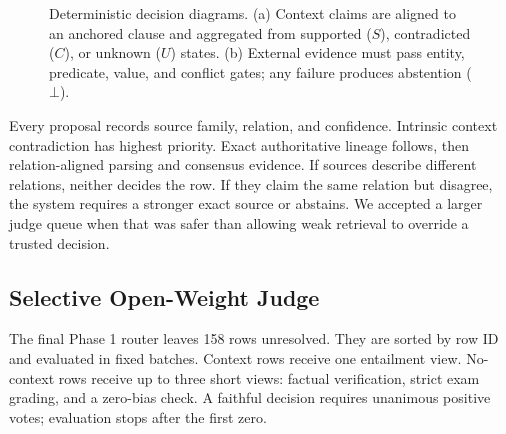 \documentclass[11pt]{article}
\begin{document}
\begin{figure}[t]
{%
}
\caption{Deterministic decision diagrams. (a) Context claims are aligned to an anchored clause and aggregated from supported ($S$), contradicted ($C$), or unknown ($U$) states. (b) External evidence must pass entity, predicate, value, and conflict gates; any failure produces abstention ($\bot$).}
\label{fig:verification}
\end{figure}

Every proposal records source family, relation, and confidence. Intrinsic context contradiction has highest priority. Exact authoritative lineage follows, then relation-aligned parsing and consensus evidence. If sources describe different relations, neither decides the row. If they claim the same relation but disagree, the system requires a stronger exact source or abstains. We accepted a larger judge queue when that was safer than allowing weak retrieval to override a trusted decision.

\subsection{Selective Open-Weight Judge}

The final Phase 1 router leaves 158 rows unresolved. They are sorted by row ID and evaluated in fixed batches. Context rows receive one entailment view. No-context rows receive up to three short views: factual verification, strict exam grading, and a zero-bias check. A faithful decision requires unanimous positive votes; evaluation stops after the first zero.
\end{document}
